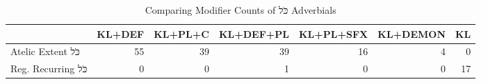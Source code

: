 \begin{table}[htbp!]
\centering
\caption{Comparing Modifier Counts of כֹּל Adverbials}
\label{table:kl_cf_ct}
\begin{adjustbox}{width=1\textwidth}
\begin{tabular}{lrrrrrr}
\toprule
{} &  KL+DEF &  KL+PL+C &  KL+DEF+PL &  KL+PL+SFX &  KL+DEMON &  KL \\
\midrule
Atelic Extent כֹּל  &      55 &       39 &         39 &         16 &         4 &   0 \\
Reg. Recurring כֹּל &       0 &        0 &          1 &          0 &         0 &  17 \\
\bottomrule
\end{tabular}
\end{adjustbox}
\end{table}
